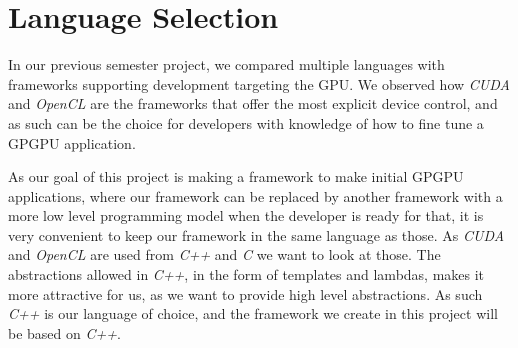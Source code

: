 \section{Language Selection}\label{cha:languageSelection}
In our previous semester project\cite{sw9Report}, we compared multiple languages with frameworks supporting development targeting the GPU. We observed how \textit{CUDA} and \textit{OpenCL} are the frameworks that offer the most explicit device control, and as such can be the choice for developers with knowledge of how to fine tune a GPGPU application.

As our goal of this project is making a framework to make initial GPGPU applications, where our framework can be replaced by another framework with a more low level programming model when the developer is ready for that, it is very convenient to keep our framework in the same language as those. As \textit{CUDA} and \textit{OpenCL} are used from \textit{C++} and \textit{C} we want to look at those. The abstractions allowed in \textit{C++}, in the form of templates and lambdas, makes it more attractive for us, as we want to provide high level abstractions. As such \textit{C++} is our language of choice, and the framework we create in this project will be based on \textit{C++}.
